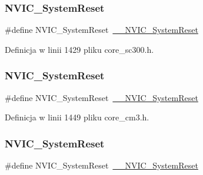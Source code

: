 \subsubsection{\texorpdfstring{N\+V\+I\+C\+\_\+\+System\+Reset}{NVIC\_SystemReset}\hspace{0.1cm}{\footnotesize\ttfamily [7/12]}}
{\footnotesize\ttfamily \#define N\+V\+I\+C\+\_\+\+System\+Reset~\hyperlink{group___c_m_s_i_s___core___n_v_i_c_functions_ga0d9aa2d30fa54b41eb780c16e35b676c}{\+\_\+\+\_\+\+N\+V\+I\+C\+\_\+\+System\+Reset}}



Definicja w linii 1429 pliku core\+\_\+sc300.\+h.

\mbox{\label{group___c_m_s_i_s___core___n_v_i_c_functions_ga6aa0367d3642575610476bf0366f0c48}} 
\subsubsection{\texorpdfstring{N\+V\+I\+C\+\_\+\+System\+Reset}{NVIC\_SystemReset}\hspace{0.1cm}{\footnotesize\ttfamily [8/12]}}
{\footnotesize\ttfamily \#define N\+V\+I\+C\+\_\+\+System\+Reset~\hyperlink{group___c_m_s_i_s___core___n_v_i_c_functions_ga0d9aa2d30fa54b41eb780c16e35b676c}{\+\_\+\+\_\+\+N\+V\+I\+C\+\_\+\+System\+Reset}}



Definicja w linii 1449 pliku core\+\_\+cm3.\+h.

\mbox{\label{group___c_m_s_i_s___core___n_v_i_c_functions_ga6aa0367d3642575610476bf0366f0c48}} 
\subsubsection{\texorpdfstring{N\+V\+I\+C\+\_\+\+System\+Reset}{NVIC\_SystemReset}\hspace{0.1cm}{\footnotesize\ttfamily [9/12]}}
{\footnotesize\ttfamily \#define N\+V\+I\+C\+\_\+\+System\+Reset~\hyperlink{group___c_m_s_i_s___core___n_v_i_c_functions_ga0d9aa2d30fa54b41eb780c16e35b676c}{\+\_\+\+\_\+\+N\+V\+I\+C\+\_\+\+System\+Reset}}



